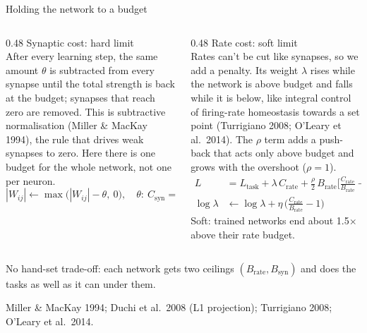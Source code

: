 \documentclass[aspectratio=169]{beamer}
\newcommand{\takeaway}[1]{\par\vfill\noindent\colorbox{black!6}{\parbox{\dimexpr\linewidth-2\fboxsep\relax}{\small #1}}}
\begin{document}
\begin{frame}{Holding the network to a budget}
  \begin{columns}[T]
    \begin{column}{0.48\textwidth}
      Synaptic cost: hard limit\\[0.3em]
      \footnotesize After every learning step, the same amount $\theta$ is subtracted from every synapse until the
      total strength is back at the budget; synapses that reach zero are removed. This is subtractive normalisation
      (Miller \& MacKay 1994), the rule that drives weak synapses to zero. Here there is one budget for the whole
      network, not one per neuron.
      \small
      \[
        |W_{ij}| \leftarrow \max\big(|W_{ij}| - \theta,\ 0\big),\quad
        \theta:\ C_{\text{syn}} = B_{\text{syn}}
      \]
    \end{column}
    \begin{column}{0.48\textwidth}
      Rate cost: soft limit\\[0.3em]
      \footnotesize Rates can't be cut like synapses, so we add a penalty. Its weight $\lambda$ rises while the
      network is above budget and falls while it is below, like integral control of firing-rate homeostasis
      towards a set point (Turrigiano 2008; O'Leary et al.\ 2014). The $\rho$ term adds a push-back that acts
      only above budget and grows with the overshoot ($\rho = 1$).
      \small
      \begin{align*}
        L &= L_{\text{task}} + \lambda\,C_{\text{rate}} + \tfrac{\rho}{2}\,B_{\text{rate}}\big[\tfrac{C_{\text{rate}}}{B_{\text{rate}}} - 1\big]_+^2\\
        \log\lambda &\leftarrow \log\lambda + \eta\,\big(\tfrac{C_{\text{rate}}}{B_{\text{rate}}} - 1\big)
      \end{align*}
      \footnotesize Soft: trained networks end about 1.5$\times$ above their rate budget.
    \end{column}
  \end{columns}
  \takeaway{No hand-set trade-off: each network gets two ceilings $(B_{\text{rate}}, B_{\text{syn}})$ and does the
  tasks as well as it can under them.}
  {\tiny\color{gray} Miller \& MacKay 1994; Duchi et al.\ 2008 (L1 projection); Turrigiano 2008; O'Leary et al.\ 2014.}
\end{frame}
\end{document}
